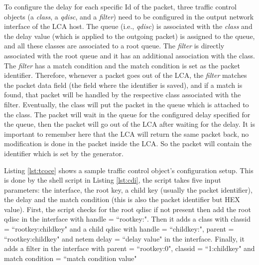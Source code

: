 To configure the delay for each specific Id of the packet, three traffic control objects (a \textit{class}, a \textit{qdisc}, and a \textit{filter}) need to be configured in the output network interface of the LCA host. The queue (i.e., \textit{qdisc}) is associated with the \textit{class} and the delay value (which is applied to the outgoing packet) is assigned to the queue, and all these classes are associated to a root queue. The \textit{filter} is directly associated with the root queue and it has an additional association with the class. The \textit{filter} has a match condition and the match condition is set as the packet identifier. Therefore, whenever a packet goes out of the LCA, the \textit{filter} matches the packet data field (the field where the identifier is saved), and if a match is found, that packet will be handled by the respective class associated with the filter. Eventually, the class will put the packet in the queue which is attached to the class. The packet will wait in the queue for the configured delay specified for the queue, then the packet will go out of the LCA after waiting for the delay. It is important to remember here that the LCA will return the same packet back, no modification is done in the packet inside the LCA. So the packet will contain the identifier which is set by the generator. 

Listing \ref{lst:tcoce} shows a sample traffic control object's configuration setup. This is done by the shell script in Listing \ref{lst:cdi}, the script takes five input parameters: the interface, the root key, a child key (usually the packet identifier), the delay and the match condition (this is also the packet identifier but HEX value). First, the script checks for the root qdisc if not present then add the root qdisc in the interface with handle = ``rootkey:". Then it adds a class with classid = ``rootkey:childkey" and a child qdisc with handle = ``childkey:", parent = ``rootkey:childkey" and netem delay = ``delay value" in the interface. Finally, it adds a filter in the interface with parent = ``rootkey:0", classid = ``1:childkey" and match condition = ``match condition value"

